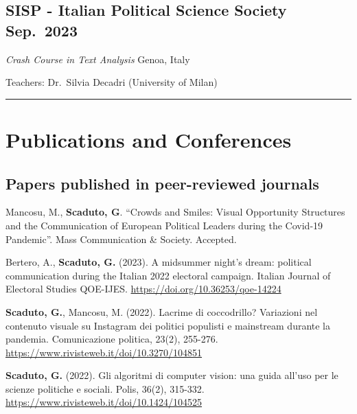 \documentclass[8pt,]{article}
\renewenvironment{itemize}{
  \begin{list}{}{
    \setlength{\leftmargin}{1.5em}
  }
}{
  \end{list}
}
\begin{document}
\hypertarget{sisp---italian-political-science-society-sep.-2023}{%
\subsection{\texorpdfstring{SISP - Italian Political Science Society
\hfill  Sep.~2023}{SISP - Italian Political Science Society Sep.~2023}}\label{sisp---italian-political-science-society-sep.-2023}}

\begin{itemize}
\item
  \emph{Crash Course in Text Analysis} \hfill Genoa, Italy
\item
  Teachers: Dr.~Silvia Decadri (University of Milan)

  \bigskip \hrule
\end{itemize}

\hypertarget{publications-and-conferences}{%
\section{Publications and
Conferences}\label{publications-and-conferences}}

\hypertarget{papers-published-in-peer-reviewed-journals}{%
\subsection{Papers published in peer-reviewed
journals}\label{papers-published-in-peer-reviewed-journals}}

\begin{itemize}
\item
  Mancosu, M., \textbf{Scaduto, G}. ``Crowds and Smiles: Visual
  Opportunity Structures and the Communication of European Political
  Leaders during the Covid-19 Pandemic''. Mass Communication \& Society.
  Accepted.
\item
  Bertero, A., \textbf{Scaduto, G.} (2023). A midsummer night's dream:
  political communication during the Italian 2022 electoral campaign.
  Italian Journal of Electoral Studies QOE-IJES.
  \url{https://doi.org/10.36253/qoe-14224}
\item
  \textbf{Scaduto, G.}, Mancosu, M. (2022). Lacrime di coccodrillo?
  Variazioni nel contenuto visuale su Instagram dei politici populisti e
  mainstream durante la pandemia. Comunicazione politica, 23(2),
  255-276. \url{https://www.rivisteweb.it/doi/10.3270/104851}
\item
  \textbf{Scaduto, G.} (2022). Gli algoritmi di computer vision: una
  guida all'uso per le scienze politiche e sociali. Polis, 36(2),
  315-332. \url{https://www.rivisteweb.it/doi/10.1424/104525}
\end{itemize}
\end{document}
